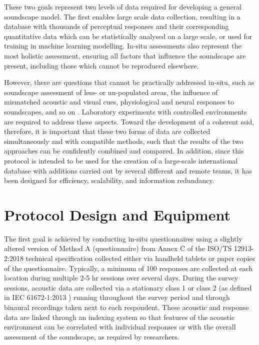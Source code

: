  These two goals represent two levels of data required for developing a general soundscape model. The first enables large scale data collection, resulting in a database with thousands of perceptual responses and their corresponding quantitative data which can be statistically analysed on a large scale, or used for training in machine learning modelling. In-situ assessments also represent the most holistic assessment, ensuring all factors that influence the soundscape are present, including those which cannot be reproduced elsewhere.

 However, there are questions that cannot be practically addressed in-situ, such as soundscape assessment of less- or un-populated areas, the influence of mismatched acoustic and visual cues, physiological and neural responses to soundscapes, and so on \citep{Kogan2017comprehensive}. Laboratory experiments with controlled environments are required to address these aspects. Toward the development of a coherent \gls{ssid}, therefore, it is important that these two forms of data are collected simultaneously and with compatible methods, such that the results of the two approaches can be confidently combined and compared. In addition, since this protocol is intended to be used for the creation of a large-scale international database with additions carried out by several different and remote teams, it has been designed for efficiency, scalability, and information redundancy.

\section{Protocol Design and Equipment}
 The first goal is achieved by conducting in-situ questionnaires using a slightly altered version of Method A (questionnaire) from Annex C of the ISO/TS 12913-2:2018 technical specification \citep{ISO12913Part2} collected either via handheld tablets or paper copies of the questionnaire. Typically, a minimum of 100 responses are collected at each location during multiple 2-5 hr sessions over several days. During the survey sessions, acoustic data are collected via a stationary class 1 or class 2  (as defined in IEC 61672-1:2013 \citep{IEC61672Part1}) running throughout the survey period and through binaural recordings taken next to each respondent. These acoustic and response data are linked through an indexing system so that features of the acoustic environment can be correlated with individual responses or with the overall assessment of the soundscape, as required by researchers.

